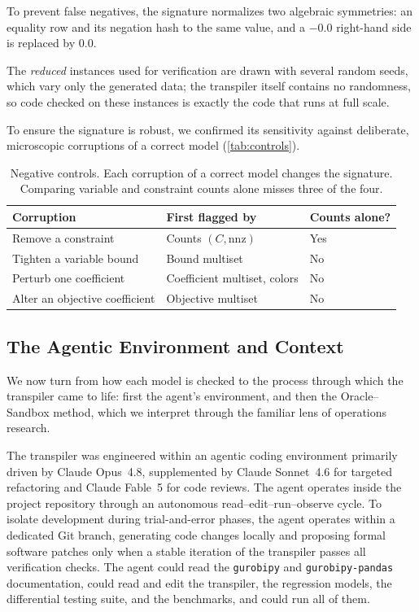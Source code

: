 \documentclass[runningheads]{llncs}
\begin{document}
To prevent false negatives, the signature normalizes two algebraic symmetries: an equality row and its negation hash to the same value, and a $-0.0$ right-hand side is replaced by $0.0$.

The \emph{reduced} instances used for verification are drawn with several random seeds, which vary only the generated data; the transpiler itself contains no randomness, so code checked on these instances is exactly the code that runs at full scale.

To ensure the signature is robust, we confirmed its sensitivity against deliberate, microscopic corruptions of a correct model (\autoref{tab:controls}).

\begin{table}[tb]
\centering
\caption{Negative controls. Each corruption of a correct model changes the signature. Comparing variable and constraint counts alone misses three of the four.}
\label{tab:controls}
\small
\begin{tabular}{@{}p{}p{}p{}@{}}
\toprule
\textbf{Corruption} & \textbf{First flagged by} & \textbf{Counts alone?} \\
\midrule
Remove a constraint & Counts $(C, \mathrm{nnz})$ & Yes \\
Tighten a variable bound & Bound multiset & No \\
Perturb one coefficient & Coefficient multiset, colors & No \\
Alter an objective coefficient & Objective multiset & No \\
\bottomrule
\end{tabular}
\end{table}




\subsection{The Agentic Environment and Context}
\label{sec:methods-env}
We now turn from how each model is checked to the process through which the transpiler came to life: first the agent's environment, and then the Oracle--Sandbox method, which we interpret through the familiar lens of operations research.

The transpiler was engineered within an agentic coding environment primarily driven by Claude Opus~4.8, supplemented by Claude Sonnet~4.6 for targeted refactoring and Claude Fable~5 for code reviews. The agent operates inside the project repository through an autonomous read--edit--run--observe cycle. To isolate development during trial-and-error phases, the agent operates within a dedicated Git branch, generating code changes locally and proposing formal software patches only when a stable iteration of the transpiler passes all verification checks. The agent could read the \texttt{gurobipy} and \texttt{gurobipy-pandas} documentation, could read and edit the transpiler, the regression models, the differential testing suite, and the benchmarks, and could run all of them.
\end{document}
